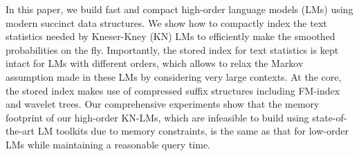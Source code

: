 In this paper, we build  fast and compact high-order \ngram language models (LMs) using modern succinct data structures.
%
We show how to compactly index the text statistics needed by Kneser-Kney (KN) LMs 
to efficiently make the smoothed probabilities on the fly.
%
Importantly, the stored index for text statistics is kept intact for \ngram LMs with different orders, 
which allows to relax the Markov assumption made in these LMs by considering very large contexts.
%
At the core, the stored index makes use of compressed suffix structures including FM-index and wavelet trees.
%
Our comprehensive experiments show that the memory footprint of our high-order KN-LMs, which are infeasible to build using 
state-of-the-art LM toolkits due to memory constraints, is the same as that for low-order LMs while maintaining 
a reasonable query time. 
